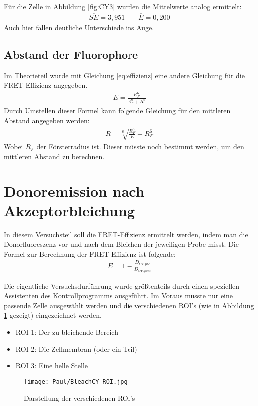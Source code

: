 Für die Zelle in Abbildung \ref{fig:CY3} wurden die Mittelwerte analog ermittelt: 
\begin{align*}
    \overline{SE} = 3,951 \qquad \overline{E} = 0,200
\end{align*}
Auch hier fallen deutliche Unterschiede ins Auge.

\subsection{Abstand der Fluorophore}
Im Theorieteil wurde mit Gleichung \ref{eq:effizienz} eine andere Gleichung für die FRET Effizienz angegeben. 
\begin{align}
    E = \frac{R_F^6}{R_F^6+R^6}
\end{align}
Durch Umstellen dieser Formel kann folgende Gleichung für den mittleren Abstand angegeben werden: 
\begin{align}
    R = \sqrt[6]{\frac{R_F^6}{E} - R_F^6} 
\end{align}
Wobei $R_F$ der Försterradius ist. Dieser müsste noch bestimmt werden, um den mittleren Abstand zu berechnen.

\newpage
\section{Donoremission nach Akzeptorbleichung}
In diesem Versuchsteil soll die FRET-Effizienz ermittelt werden, indem man die Donorfluoreszenz vor und nach dem Bleichen der jeweiligen Probe misst. Die Formel zur Berechnung der FRET-Effizienz ist folgende: 
\begin{align}
    E = 1 - \frac{D_{CY,pre}}{D_{CY,post}}
\end{align}

Die eigentliche Versuchsdurführung wurde größtenteils durch einen speziellen Assistenten des Kontrollprogramms ausgeführt. Im Voraus musste nur eine passende Zelle ausgewählt werden und die verschiedenen ROI's (wie in Abbildung \ref{fig:ROIs} gezeigt) eingezeichnet werden.
\begin{itemize}
    \item ROI 1: Der zu bleichende Bereich
    \item ROI 2: Die Zellmembran (oder ein Teil)
    \item ROI 3: Eine helle Stelle
\end{itemize}

\begin{figure}[h]
    \centering
    \texttt{[image: Paul/BleachCY-ROI.jpg]}
    \caption{Darstellung der verschiedenen ROI's}
    \label{fig:ROIs}
\end{figure}

